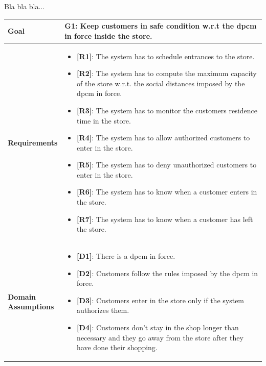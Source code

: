 Bla bla bla...

\begin{table}[H]
\centering
\begin{tabular}{| m{} | m{} |} 
	\hline
	\textbf{Goal} &
		\textbf{G1: Keep customers in safe condition w.r.t the \gls{dpcm} in force inside the store.} \\
	\hline
	\textbf{Requirements} &
		\begin{itemize}
			\item {\textbf{[R1]}}: The system has to schedule entrances to the store.
			\item {\textbf{[R2]}}: The system has to compute the maximum capacity of the store w.r.t. the social distances imposed by the \gls{dpcm} in force.
			\item {\textbf{[R3]}}: The system has to monitor the customers residence time in the store.
			\item {\textbf{[R4]}}: The system has to allow authorized customers to enter in the store.
			\item {\textbf{[R5]}}: The system has to deny unauthorized customers to enter in the store.
			\item {\textbf{[R6]}}: The system has to know when a customer enters in the store.
			\item {\textbf{[R7]}}: The system has to know when a customer has left the store.
		\end{itemize} \\
	\hline
	\shortstack[l]{\textbf{Domain} \\ \textbf{Assumptions}} & 
		\begin{itemize}
			\item {\textbf{[D1]}}: There is a \gls{dpcm} in force.
			\item {\textbf{[D2]}}: Customers follow the rules imposed by the \gls{dpcm} in force.
			\item {\textbf{[D3]}}: Customers enter in the store only if the system authorizes them.
			\item {\textbf{[D4]}}: Customers don't stay in the shop longer than necessary and they go away from the store after they have done their shopping.
		\end{itemize} \\ 
	\hline
\end{tabular}
\end{table}

